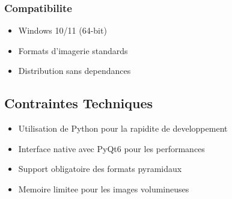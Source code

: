 \documentclass[12pt,a4paper]{article}
\begin{document}
\subsubsection{Compatibilite}
\begin{itemize}
\item Windows 10/11 (64-bit)
\item Formats d'imagerie standards
\item Distribution sans dependances
\end{itemize}

\subsection{Contraintes Techniques}

\begin{itemize}
\item Utilisation de Python pour la rapidite de developpement
\item Interface native avec PyQt6 pour les performances
\item Support obligatoire des formats pyramidaux
\item Memoire limitee pour les images volumineuses
\end{itemize}
\end{document}
